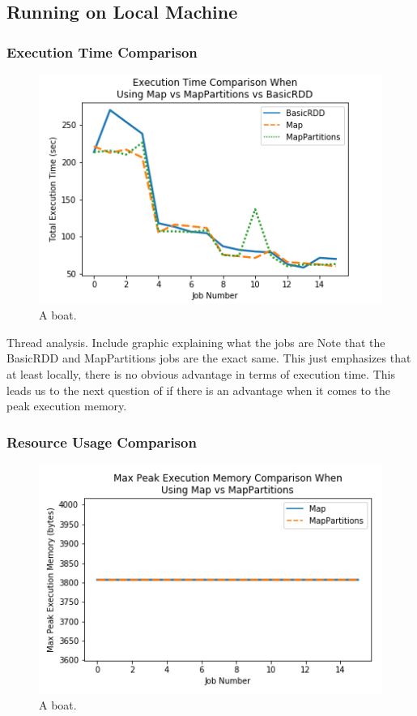 \documentclass[conference]{IEEEtran}
\begin{document}
\subsection{Running on Local Machine}

\subsubsection{Execution Time Comparison}
\begin{figure}
    \includegraphics[width=\linewidth]{../python_scripts/images/mapVsMapPartitionsAllExecutionTime.png}
    \caption{A boat.}
    \label{fig:boat1}
\end{figure}

Thread analysis.
Include graphic explaining what the jobs are
Note that the BasicRDD and MapPartitions jobs are the exact same.  This just emphasizes that at least locally, there is no obvious advantage in terms of execution time.
This leads us to the next question of if there is an advantage when it comes to the peak execution memory.

\subsubsection{Resource Usage Comparison}
\begin{figure}
    \includegraphics[width=\linewidth]{../python_scripts/images/mapVsMapPartitionsMaxPeakExecutionMemory.png}
    \caption{A boat.}
    \label{fig:boat1}
\end{figure}
\end{document}
